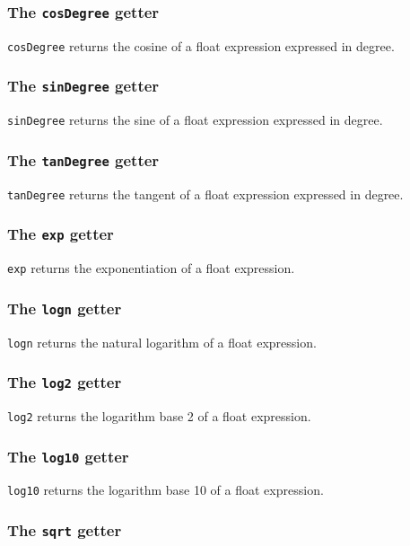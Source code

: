 \documentclass[10pt,openright,twosides,final]{memoir}
\newcommand{\gtlinline}[1]{\colorbox{light-blue}{\lstinline[language=gtl]{#1}}}
\begin{document}
\subsubsection{The \texttt{cosDegree} getter}

\gtlinline{cosDegree} returns the cosine of a float expression expressed in degree.

\subsubsection{The \texttt{sinDegree} getter}

\gtlinline{sinDegree} returns the sine of a float expression expressed in degree.

\subsubsection{The \texttt{tanDegree} getter}

\gtlinline{tanDegree} returns the tangent of a float expression expressed in degree.

\subsubsection{The \texttt{exp} getter}

\gtlinline{exp} returns the exponentiation of a float expression.

\subsubsection{The \texttt{logn} getter}

\gtlinline{logn} returns the natural logarithm of a float expression.

\subsubsection{The \texttt{log2} getter}

\gtlinline{log2} returns the logarithm base 2 of a float expression.
  
\subsubsection{The \texttt{log10} getter}

\gtlinline{log10} returns the logarithm base 10 of a float expression.

\subsubsection{The \texttt{sqrt} getter}
\end{document}
